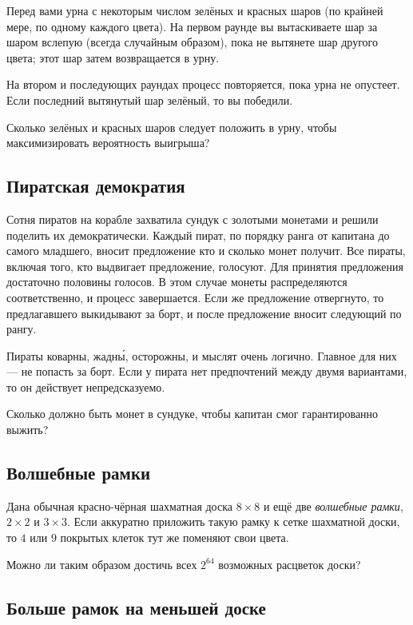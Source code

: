 Перед вами урна с некоторым числом зелёных и красных шаров (по крайней мере, по одному каждого цвета).
На первом раунде вы вытаскиваете шар за шаром вслепую (всегда случайным образом), пока не вытянете шар другого цвета; этот шар затем возвращается в урну.

На втором и последующих раундах процесс повторяется, пока урна не опустеет.
Если последний вытянутый шар зелёный, то вы победили.

Сколько зелёных и красных шаров следует положить в урну, чтобы максимизировать вероятность выигрыша?

\subsection*{Пиратская демократия}

Сотня пиратов на корабле захватила сундук с золотыми монетами и решили поделить их демократически.
Каждый пират, по порядку ранга от капитана до самого младшего, вносит предложение кто и сколько монет получит.
Все пираты, включая того, кто выдвигает предложение, голосуют.
Для принятия предложения достаточно половины голосов.
В этом случае монеты распределяются соответственно, и процесс завершается.
Если же предложение отвергнуто, то предлагавшего выкидывают за борт, и после предложение вносит следующий по рангу.

Пираты коварны, жадн\'{ы}, осторожны, и мыслят очень логично.
Главное для них --- не попасть за борт.
Если у пирата нет предпочтений между двумя вариантами, то он действует непредсказуемо.

Сколько должно быть монет в сундуке, чтобы капитан смог гарантированно выжить?

\subsection*{Волшебные рамки}

Дана обычная красно-чёрная шахматная доска $8 \times 8$ и ещё две \emph{волшебные рамки},  $2 \times 2$ и $3 \times 3$.
Если аккуратно приложить такую рамку к сетке шахматной доски, то $4$ или $9$ покрытых клеток тут же поменяют свои цвета.

Можно ли таким образом достичь всех $2^{64}$ возможных расцветок доски?

\subsection*{Больше рамок на меньшей доске}

